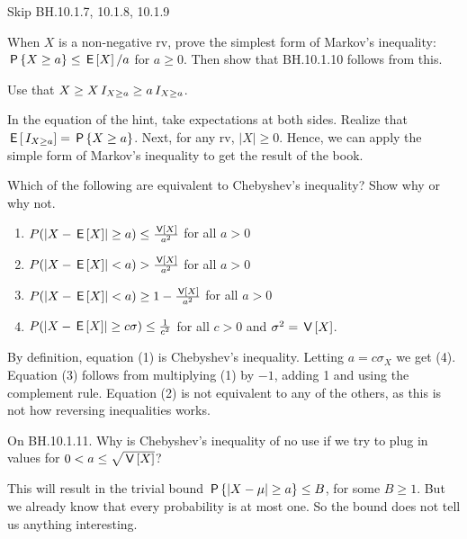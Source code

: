 \begin{remark}
Skip  BH.10.1.7, 10.1.8, 10.1.9
\end{remark}

\begin{exercise}
When  $X$ is a non-negative rv, prove the simplest form of Markov's inequality: $\P{X\geq a} \leq \E X/a$ for $a\geq 0$. Then show that BH.10.1.10 follows from this.
\begin{hint}
Use that $X\geq X\1{X\geq a} \geq a \1{X\geq a}$.
\end{hint}
\begin{solution}
In the equation of the hint, take expectations at both sides. Realize that $\E{\1{X\geq a}} =\P{X\geq a}$. Next, for any rv, $|X|\geq 0$. Hence, we can apply the simple form of Markov's inequality to get the result of the book.
\end{solution}
\end{exercise}


\begin{exercise}
Which of the following are equivalent to Chebyshev's inequality? Show why or why not.
\begin{enumerate}
    \item $P(\left|X-\E X \right| \geq a) \leq \frac{\V X}{a^2}$ for all $a>0$
    \item $P(\left|X-\E X \right| < a) > \frac{\V X}{a^2}$ for all $a>0$
    \item $P(\left|X-\E X \right| < a) \geq 1-\frac{\V X}{a^2}$ for all $a>0$
    \item $P(\left|X-\E X \right| \geq c\sigma) \leq \frac{1}{c^2}$ for all $c>0$ and $\sigma^2=\V X$.
\end{enumerate}
\begin{solution}
By definition, equation (1) is Chebyshev's inequality. Letting $a=c\sigma_X$ we get (4). Equation (3) follows from multiplying (1) by $-1$, adding 1 and using the complement rule. Equation (2) is not equivalent to any of the others, as this is not how reversing inequalities works.
\end{solution}
\end{exercise}

\begin{exercise} On BH.10.1.11.
Why is Chebyshev's inequality of no use if we try to plug in values for $0<a\leq \sqrt{\V{X}}$?

\begin{solution}
This will result in the trivial bound $\P{|X - \mu| \geq a}\leq B$, for some $B\geq 1$. But we already know that every probability is at most one. So the bound does not tell us anything interesting.
\end{solution}
\end{exercise}



